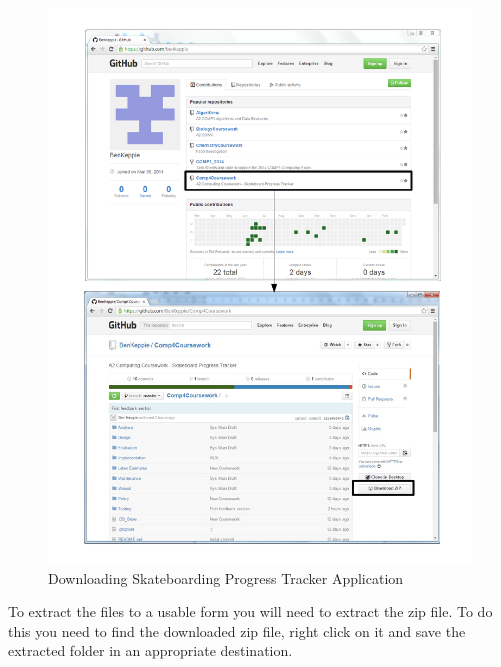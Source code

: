 \begin{figure}[H]
    \includegraphics[width=\textwidth]{./Manual/Images/BenGithub.pdf}
    \caption{Downloading Skateboarding Progress Tracker Application} \label{fig:Downloading Program}
\end{figure}

To extract the files to a usable form you will need to extract the zip file. To do this you need to find the downloaded zip file, right click on it and save the extracted folder in an appropriate destination.

